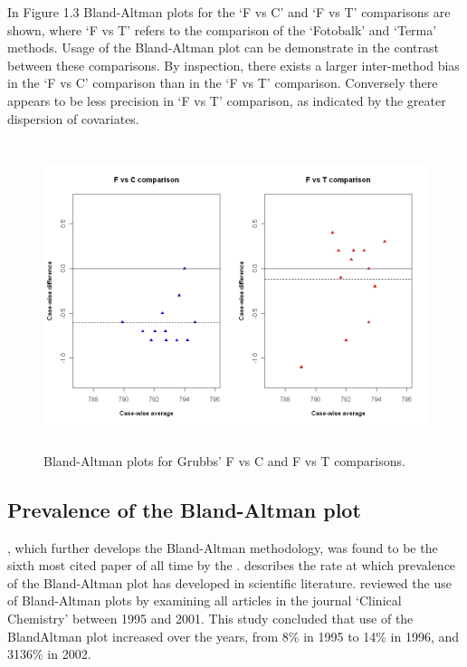 \documentclass[Chap2main.tex]{subfiles}
\begin{document}
In Figure 1.3 Bland-Altman plots for the `F vs C' and `F vs T'
comparisons are shown, where `F vs T' refers to the comparison of
the `Fotobalk' and `Terma' methods. Usage of the Bland-Altman plot
can be demonstrate in the contrast between these comparisons. By inspection, there exists a larger inter-method bias in the `F vs C' comparison than in the `F vs T' comparison. Conversely there
appears to be less precision in `F vs T' comparison, as indicated
by the greater dispersion of covariates.

\begin{figure}[h!]
	\begin{center}
		\includegraphics[height=90mm]{GrubbsDataTwoBAplots.jpeg}
		\caption{Bland-Altman plots for Grubbs' F vs C and F vs T comparisons.}\label{GrubbsDataTwoBAplots}
	\end{center}
\end{figure}

\newpage

\subsection{Prevalence of the Bland-Altman plot}
\citet*{BA86}, which further develops the Bland-Altman methodology,
was found to be the sixth most cited paper of all time by the
\citet{BAcite}. \cite{Dewitte} describes the rate at which prevalence of the Bland-Altman plot has developed in scientific
literature. \citet{Dewitte} reviewed the use of Bland-Altman plots by examining all articles in the journal `Clinical Chemistry' between 1995 and 2001. This study concluded that use of the BlandAltman plot increased over the years, from 8\% in 1995 to 14\% in 1996, and 3136\% in 2002.
\end{document}

